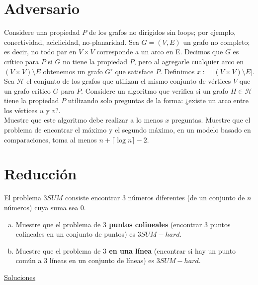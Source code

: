 \documentclass[dcc,uchile]{fcfmcourse}
\theoremstyle{plain}
\theoremstyle{definition}
\begin{document}
\begin{problems}
\section*{Adversario}
\problem Considere una propiedad $P$ de los grafos no dirigidos sin loops; por ejemplo, conectividad, aciclicidad, no-planaridad. Sea $G = (V, E)$ un grafo no completo; es decir, no todo par en $V\times V$ corresponde a un arco en E. Decimos que $G$ es crítico para $P$ si $G$ no tiene la propiedad $P$, pero al agregarle cualquier arco en $(V\times V)\setminus E$ obtenemos un grafo $G'$ que satisface $P$. Definimos $x := |(V\times V )\setminus E|$.\\
Sea $\mathcal{H}$ el conjunto de los grafos que utilizan el mismo conjunto de vértices $V$ que un grafo crítico $G$
para $P$. Considere un algoritmo que verifica si un grafo $H \in \mathcal{H}$ tiene la propiedad $P$ utilizando solo
preguntas de la forma: ¿existe un arco entre los vértices $u$ y $v$?. \\
Muestre que este algoritmo debe
realizar a lo menos $x$ preguntas.
\problem Muestre que el problema de encontrar el máximo y el segundo máximo, en un modelo basado en comparaciones, toma al menos $n + \lceil\log{n}\rceil - 2$.
\section*{Reducción}
\problem El problema $3SUM$ consiste encontrar $3$ números diferentes (de un conjunto de $n$ números) cuya suma sea $0$.
\begin{enumerate}[a)]
\item Muestre que el problema de \textbf{$3$ puntos colineales} (encontrar 3 puntos colineales en un conjunto de puntos) es $3SUM-hard$.
\item Muestre que el problema de \textbf{$3$ en una línea} (encontrar si hay un punto común a 3 líneas en un conjunto de líneas) es $3SUM-hard$.
\end{enumerate}
\end{problems}
\newpage
\begin{center}
{\huge \underline{Soluciones}}
\end{center}
\end{document}
